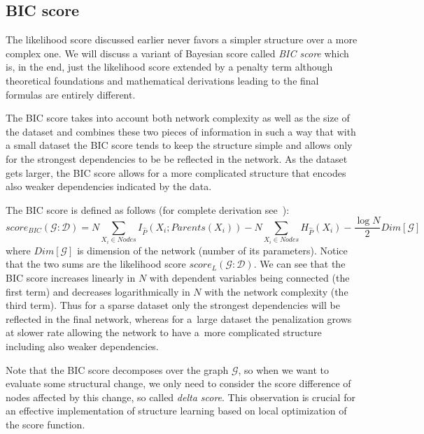 \documentclass[english,cover]{fitthesis} %
\newcommand{\term}[1]{\emph{#1}}           %
\newcommand{\note}[1]{{\color{green}#1}}
\begin{document}
\subsection{BIC score}
The likelihood score discussed earlier never favors a simpler structure over a more complex one. We will discuss a variant of Bayesian score called \term{BIC score} which is, in the end, just the likelihood score extended by a penalty term although theoretical foundations and mathematical derivations leading to the final formulas are entirely different.


The BIC score takes into account both network complexity as well as the size of the dataset and combines these two pieces of information in such a way that with a small dataset the BIC score tends to keep the structure simple and allows only for the strongest dependencies to be be reflected in the network. As the dataset gets larger, the BIC score allows for a more complicated structure that encodes also weaker dependencies indicated by the data.

The BIC score is defined as follows (for complete derivation see~\cite[p.~794]{pgm}):
\begin{equation}\label{eq:bic_score}
    score_{BIC}(\mathcal{G} : \mathcal{D}) = N \!\!\!\!\!\! \sum_{X_i \in Nodes} \!\!\!\!\!\! I_{\hat P}(X_i;Parents(X_i)) - N \!\!\!\!\!\! \sum_{X_i \in Nodes} \!\!\!\!\!\! H_{\hat P}(X_i) - \frac{\log N}{2} Dim[\mathcal{G}]
\end{equation}
where $Dim[\mathcal{G}]$ is dimension of the network (number of its parameters). Notice that the two sums are the likelihood score $score_{L}(\mathcal{G} : \mathcal{D})$. We can see that the BIC score increases linearly in $N$ with dependent variables being connected (the first term) and decreases logarithmically in $N$ with the network complexity (the third term). Thus for a sparse dataset only the strongest dependencies will be reflected in the final network, whereas for a~large dataset the penalization grows at slower rate allowing the network to have a~more complicated structure including also weaker dependencies.

Note that the BIC score decomposes over the graph $\mathcal{G}$, so when we want to evaluate some structural change, we only need to consider the score difference of nodes affected by this change, so called \term{delta score}. This observation is crucial for an effective implementation of structure learning based on local optimization of the score function. 
\end{document}
